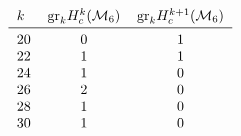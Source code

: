 ﻿\documentclass[a4paper,12pt]{article}
\theoremstyle{plain}%
\theoremstyle{definition}
\begin{document}
\[\begin{tabular}{lcc} $k$ & $\mathrm{gr}_k H_c^{k}(\mathcal{M}_{6})$ & $\mathrm{gr}_{k} H_c^{k+1}(\mathcal{M}_{6})$ 
 \\\midrule
$20$ & $0$ & $1$ \\
$22$ & $1$ & $1$ \\
$24$ & $1$ & $0$ \\
$26$ & $2$ & $0$ \\
$28$ & $1$ & $0$ \\
$30$ & $1$ & $0$ \\
\end{tabular}\]
\end{document}
